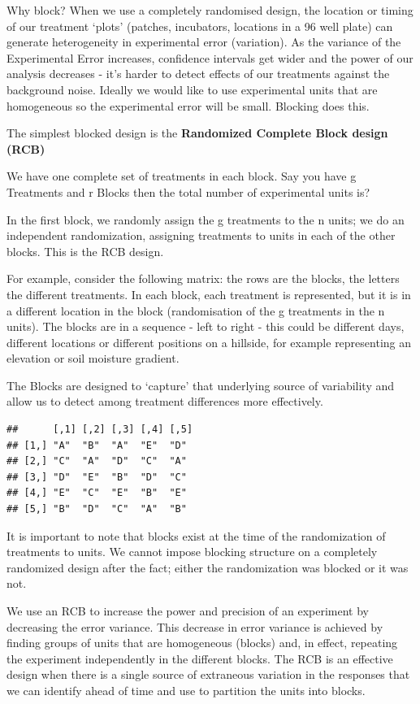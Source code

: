 \documentclass[
]{book}
\begin{document}
Why block? When we use a completely randomised design, the location or timing of our treatment `plots' (patches, incubators, locations in a 96 well plate) can generate heterogeneity in experimental error (variation). As the variance of the Experimental Error increases, confidence intervals get wider and the power of our analysis decreases - it's harder to detect effects of our treatments against the background noise. Ideally we would like to use experimental units that are homogeneous so the experimental error will be small. Blocking does this.

The simplest blocked design is the \textbf{Randomized Complete Block design (RCB)}

We have one complete set of treatments in each block. Say you have g Treatments and r Blocks then the total number of experimental units is?

In the first block, we randomly assign the g treatments to the n units; we do an independent randomization, assigning treatments to units in each of the other blocks. This is the RCB design.

For example, consider the following matrix: the rows are the blocks, the letters the different treatments. In each block, each treatment is represented, but it is in a different location in the block (randomisation of the g treatments in the n units). The blocks are in a sequence - left to right - this could be different days, different locations or different positions on a hillside, for example representing an elevation or soil moisture gradient.

The Blocks are designed to `capture' that underlying source of variability and allow us to detect among treatment differences more effectively.

\begin{verbatim}
##      [,1] [,2] [,3] [,4] [,5]
## [1,] "A"  "B"  "A"  "E"  "D" 
## [2,] "C"  "A"  "D"  "C"  "A" 
## [3,] "D"  "E"  "B"  "D"  "C" 
## [4,] "E"  "C"  "E"  "B"  "E" 
## [5,] "B"  "D"  "C"  "A"  "B"
\end{verbatim}

It is important to note that blocks exist at the time of the randomization of treatments to units. We cannot impose blocking structure on a completely randomized design after the fact; either the randomization was blocked or it was not.

We use an RCB to increase the power and precision of an experiment by decreasing the error variance. This decrease in error variance is achieved by finding groups of units that are homogeneous (blocks) and, in effect, repeating the experiment independently in the different blocks. The RCB is an effective design when there is a single source of extraneous variation in the responses that we can identify ahead of time and use to partition the units into blocks.
\end{document}
